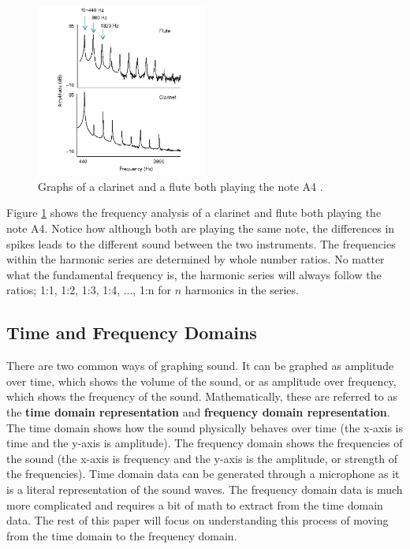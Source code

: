 \documentclass[10pt]{article}
\begin{document}
\begin{figure}[H]
    \centering
    \includegraphics[width=0.5\textwidth]{FluteClarinetFrequencySpectrum.jpg}
    \caption{Graphs of a clarinet and a flute both playing the note A4 \cite{}.} 
    \label{fig:clarinet vs. flute}
\end{figure}

Figure \ref{fig:clarinet vs. flute} shows the frequency analysis of a clarinet and flute both playing the note A4. Notice how although both are playing the same note, the differences in spikes leads to the different sound between the two instruments. The frequencies within the harmonic series are determined by whole number ratios. No matter what the fundamental frequency is, the harmonic series will always follow the ratios; 1:1, 1:2, 1:3, 1:4, ..., 1:n for $n$ harmonics in the series.


\subsection{Time and Frequency Domains}
\hspace{\parindent} There are two common ways of graphing sound. It can be graphed as amplitude over time, which shows the volume of the sound, or as amplitude over frequency, which shows the frequency of the sound. Mathematically, these are referred to as the \textbf{time domain representation} and \textbf{frequency domain representation}. The time domain shows how the sound physically behaves over time (the x-axis is time and the y-axis is amplitude). The frequency domain shows the frequencies of the sound (the x-axis is frequency and the y-axis is the amplitude, or strength of the frequencies). Time domain data can be generated through a microphone as it is a literal representation of the sound waves. The frequency domain data is much more complicated and requires a bit of math to extract from the time domain data. The rest of this paper will focus on understanding this process of moving from the time domain to the frequency domain.
\end{document}
